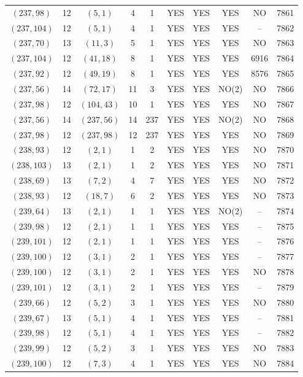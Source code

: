 \begin{longtable}{|c|c|c|c|c|c|c|c|c|c|}
$(237, 98)$ & 12 & $(5, 1)$ & 4 & 1 & YES & YES & YES & NO & 7861\\
$(237, 104)$ & 12 & $(5, 1)$ & 4 & 1 & YES & YES & YES & -- & 7862\\
$(237, 70)$ & 13 & $(11, 3)$ & 5 & 1 & YES & YES & YES & NO & 7863\\
$(237, 104)$ & 12 & $(41, 18)$ & 8 & 1 & YES & YES & YES & 6916 & 7864\\
$(237, 92)$ & 12 & $(49, 19)$ & 8 & 1 & YES & YES & YES & 8576 & 7865\\
$(237, 56)$ & 14 & $(72, 17)$ & 11 & 3 & YES & YES & NO(2) & NO & 7866\\
$(237, 98)$ & 12 & $(104, 43)$ & 10 & 1 & YES & YES & YES & NO & 7867\\
$(237, 56)$ & 14 & $(237, 56)$ & 14 & 237 & YES & YES & NO(2) & NO & 7868\\
$(237, 98)$ & 12 & $(237, 98)$ & 12 & 237 & YES & YES & YES & NO & 7869\\
$(238, 93)$ & 12 & $(2, 1)$ & 1 & 2 & YES & YES & YES & NO & 7870\\
$(238, 103)$ & 13 & $(2, 1)$ & 1 & 2 & YES & YES & YES & NO & 7871\\
$(238, 69)$ & 13 & $(7, 2)$ & 4 & 7 & YES & YES & YES & NO & 7872\\
$(238, 93)$ & 12 & $(18, 7)$ & 6 & 2 & YES & YES & YES & NO & 7873\\
$(239, 64)$ & 13 & $(2, 1)$ & 1 & 1 & YES & YES & NO(2) & -- & 7874\\
$(239, 98)$ & 12 & $(2, 1)$ & 1 & 1 & YES & YES & YES & -- & 7875\\
$(239, 101)$ & 12 & $(2, 1)$ & 1 & 1 & YES & YES & YES & -- & 7876\\
$(239, 100)$ & 12 & $(3, 1)$ & 2 & 1 & YES & YES & YES & -- & 7877\\
$(239, 100)$ & 12 & $(3, 1)$ & 2 & 1 & YES & YES & YES & NO & 7878\\
$(239, 101)$ & 12 & $(3, 1)$ & 2 & 1 & YES & YES & YES & -- & 7879\\
$(239, 66)$ & 12 & $(5, 2)$ & 3 & 1 & YES & YES & YES & NO & 7880\\
$(239, 67)$ & 13 & $(5, 1)$ & 4 & 1 & YES & YES & YES & -- & 7881\\
$(239, 98)$ & 12 & $(5, 1)$ & 4 & 1 & YES & YES & YES & -- & 7882\\
$(239, 99)$ & 12 & $(5, 2)$ & 3 & 1 & YES & YES & YES & NO & 7883\\
$(239, 100)$ & 12 & $(7, 3)$ & 4 & 1 & YES & YES & YES & NO & 7884\\

\end{longtable}
